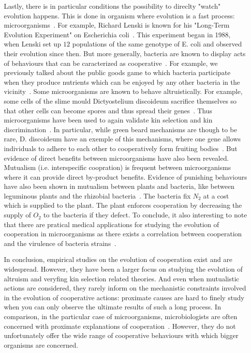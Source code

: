     Lastly, there is in particular conditions the possibility to direclty "watch" evolution happens. This is done in organism where evolution is a fast process: microorganisms~\cite{Elena2003}. For example, Richard Lenski is known for his "Long-Term Evolution Experiment" on Escherichia coli~\cite{Fox2015}. This experiment began in 1988, when Lenski set up $12$ populations of the same genotype of E. coli and observed their evolution since then. But more generally, bacteria are known to display acts of behaviours that can be caracterized as cooperative~\cite{West2006}. For example, we previously talked about the public goods game to which bacteria participate when they produce nutrients which can be enjoyed by any other bacteria in the vicinity~\cite{Harrison2013}. Some microorganisms are known to behave altruistically. For example, some cells of the slime mould Dictyostelium discoideum sacrifice themselves so that other cells can become spores and thus spread their genes~\cite{Strassmann2000}. Thus microorganisms have been used to again validate kin selection and kin discrimination~\cite{West2006}. In particular, while green beard mechanisms are though to be rare, D. discoideum have an exemple of this mechanisms, where one gene allows individuals to adhere to each other to cooperatively form fruiting bodies~\cite{Queller2003}. But evidence of direct benefits between microorganisms have also been revealed. Mutualism (i.e. interspecific coopration) is frequent between microorganisms where it can provide direct by-product benefits. Evidence of punishing behaviours have also been shown in mutualism between plants and bacteria, like between leguminous plants and the rhizobial bacteria~\cite{Kiers2003}. The bacteria fix $N_{2}$ at a cost which is supplied to the plant. The plant enforces cooperation by decreasing the supply of $O_{2}$ to the bacteria if they defect. To conclude, it also interesting to note that there are pratical medical applications for studying the evolution of cooperation in microorganisms as there exists a correlation between cooperation and the virulence of bacteria strains~\cite{Foster2005}.


    In conclusion, empirical studies on the evolution of cooperation exist and are widespread. However, they have been a larger focus on studying the evolution of altruism and veryfing kin selection related theories. And even when mutualistic actions are considered, they rarely inform on the mechanistic constraints involved in the evolution of cooperative actions: proximate causes are hard to finely study when you can only observe the ultimate results of such a long process. In comparison, in the particular case of microorganisms, microbiologists are often concerned with proximate explanations of cooperation~\cite{West2006}. However, they do not unfortunately offer the wide range of cooperative behaviours with which bigger organisms are concerned.

